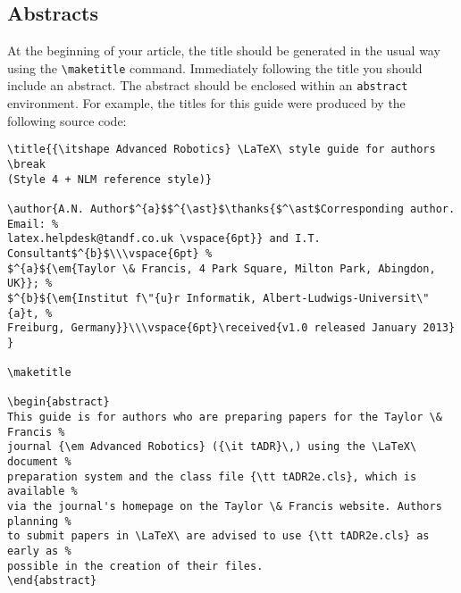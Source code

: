 \documentclass{tADR2e}
\begin{document}
\subsection{Abstracts}

At the beginning of your article, the title should be generated in the usual way using the {\verb"\maketitle"}
command. Immediately following the title you should include an abstract. The abstract should be enclosed within
an {\tt abstract} environment. For example, the titles for this guide were produced by the following source code:
%
\begin{verbatim}
\title{{\itshape Advanced Robotics} \LaTeX\ style guide for authors \break
(Style 4 + NLM reference style)}

\author{A.N. Author$^{a}$$^{\ast}$\thanks{$^\ast$Corresponding author. Email: %
latex.helpdesk@tandf.co.uk \vspace{6pt}} and I.T. Consultant$^{b}$\\\vspace{6pt} %
$^{a}${\em{Taylor \& Francis, 4 Park Square, Milton Park, Abingdon, UK}}; %
$^{b}${\em{Institut f\"{u}r Informatik, Albert-Ludwigs-Universit\"{a}t, %
Freiburg, Germany}}\\\vspace{6pt}\received{v1.0 released January 2013} }

\maketitle

\begin{abstract}
This guide is for authors who are preparing papers for the Taylor \& Francis %
journal {\em Advanced Robotics} ({\it tADR}\,) using the \LaTeX\ document %
preparation system and the class file {\tt tADR2e.cls}, which is available %
via the journal's homepage on the Taylor \& Francis website. Authors planning %
to submit papers in \LaTeX\ are advised to use {\tt tADR2e.cls} as early as %
possible in the creation of their files.
\end{abstract}
\end{verbatim}

\end{document}

